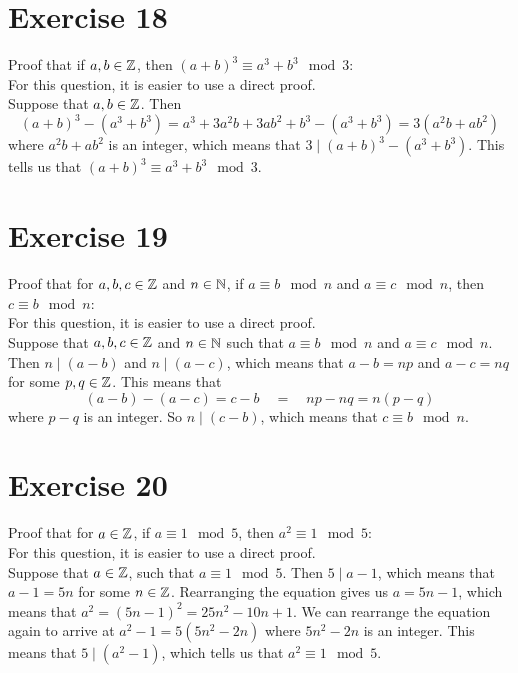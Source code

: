 \documentclass[12pt]{article}
\begin{document}
    \section*{Exercise 18}
    Proof that if $a, b \in \mathbb{Z}$,
    then $(a+b)^3 \equiv a^3 + b^3 \mod 3$: \\
    For this question, it is easier to use a direct proof. \\
    Suppose that $a, b \in \mathbb{Z}$.
    Then
    \[ (a+b)^3 - (a^3 + b^3) = a^3 + 3a^2b + 3ab^2 + b^3 - (a^3 + b^3) 
    = 3(a^2b + ab^2) \]
    where $a^2b + ab^2$ is an integer,
    which means that $3 \mid (a+b)^3 - (a^3 + b^3)$.
    This tells us that $(a+b)^3 \equiv a^3 + b^3 \mod 3$. \\

    \section*{Exercise 19}
    Proof that for $a, b, c \in \mathbb{Z}$ and $n \in \mathbb{N}$,
    if $a \equiv b \mod n$ and $a \equiv c \mod n$,
    then $c \equiv b \mod n$: \\
    For this question, it is easier to use a direct proof. \\
    Suppose that $a, b, c \in \mathbb{Z}$ and $n \in \mathbb{N}$
    such that $a \equiv b \mod n$ and $a \equiv c \mod n$.
    Then $n \mid (a - b)$ and $n \mid (a - c)$,
    which means that $a-b = np$ and $a-c = nq$
    for some $p, q \in \mathbb{Z}$.
    This means that
    \[ (a-b)-(a-c) = c - b  \quad = \quad np - nq = n(p -q) \]
    where $p-q$ is an integer.
    So $n \mid (c - b)$,
    which means that $c \equiv b \mod n$. \\

    \section*{Exercise 20}
    Proof that for $a \in \mathbb{Z}$,
    if $a \equiv 1 \mod 5$,
    then $a^2 \equiv 1 \mod 5$: \\
    For this question, it is easier to use a direct proof. \\
    Suppose that $a \in \mathbb{Z}$,
    such that $a \equiv 1 \mod 5$.
    Then $5 \mid a-1$,
    which means that $a-1 = 5n$ for some $n \in \mathbb{Z}$.
    Rearranging the equation gives us $a = 5n - 1$,
    which means that $a^2 = (5n-1)^2 = 25n^2 -10n + 1$.
    We can rearrange the equation again to arrive
    at $a^2 - 1 = 5(5n^2 - 2n)$
    where $5n^2 - 2n$ is an integer.
    This means that $5 \mid (a^2 - 1)$,
    which tells us that $a^2 \equiv 1  \mod 5$. \\
\end{document}
